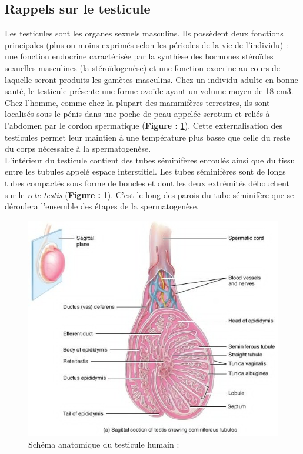 \documentclass[12pt,twoside]{reedthesis}
\theoremstyle{definition}
\theoremstyle{definition}
\theoremstyle{remark}
\begin{document}
  \subsection{Rappels sur le testicule}\label{rappels-sur-le-testicule}
  
  Les testicules sont les organes sexuels masculins. Ils possèdent deux
  fonctions principales (plus ou moins exprimés selon les périodes de la
  vie de l'individu) : une fonction endocrine caractérisée par la synthèse
  des hormones stéroïdes sexuelles masculines (la stéroïdogenèse) et une
  fonction exocrine au cours de laquelle seront produits les gamètes
  masculins. Chez un individu adulte en bonne santé, le testicule présente
  une forme ovoïde ayant un volume moyen de 18 cm3. Chez l'homme, comme
  chez la plupart des mammifères terrestres, ils sont localisés sous le
  pénis dans une poche de peau appelée scrotum et reliés à l'abdomen par
  le cordon spermatique (\textbf{Figure :} \ref{fig:testicule}). Cette
  externalisation des testicules permet leur maintien à une température
  plus basse que celle du reste du corps nécessaire à la spermatogenèse.\\
  L'intérieur du testicule contient des tubes séminifères enroulés ainsi
  que du tissu entre les tubules appelé espace interstitiel. Les tubes
  séminifères sont de longs tubes compactés sous forme de boucles et dont
  les deux extrémités débouchent sur le \emph{rete testis} (\textbf{Figure
  :} \ref{fig:testicule}). C'est le long des parois du tube séminifère que
  se déroulera l'ensemble des étapes de la spermatogenèse.
  
  \begin{figure}
  
  {\centering \includegraphics[scale=0.65]{figure/coupe_testicule2} 
  
  }
  
  \caption{Schéma anatomique du testicule humain : }\label{fig:testicule}
  \end{figure}
  
\end{document}
